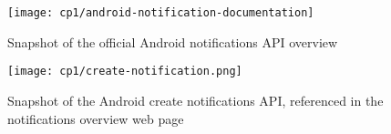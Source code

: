 \clearpage


\begin{landscape}
\begin{figure}
    \centering
    \texttt{[image: cp1/android-notification-documentation]}
    \caption{Snapshot of the official Android notifications API overview}
    \label{fig:android-notifications-api-page}
\end{figure}
\end{landscape}


\clearpage


\begin{landscape}
\begin{figure}
    \centering
    \texttt{[image: cp1/create-notification.png]}
    \caption{Snapshot of the Android create notifications API, referenced in the notifications overview web page}
    \label{fig:android-create-notification}
\end{figure}
\end{landscape}
